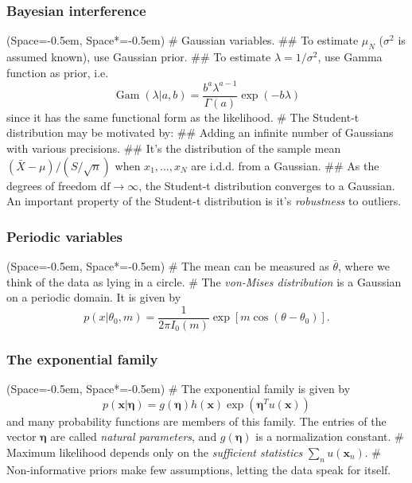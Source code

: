 \documentclass[12pt, a4paper]{article}
\newcommand{\listSpace}{-0.5em}%
\newcommand{\vect}[1]{\bm{#1}}
\begin{document}
\subsubsection*{Bayesian interference}
\begin{easylist}[itemize]
	\ListProperties(Space=\listSpace, Space*=\listSpace)
	# Gaussian variables.
	## To estimate $\mu_N$ ($\sigma^2$ is assumed known), use Gaussian prior.
	## To estimate $\lambda = 1/\sigma^2$, use Gamma function as prior, i.e.
	\begin{equation*}
	\operatorname{Gam}(\lambda | a, b) = \frac{b^a \lambda^{a-1}}{\Gamma(a)} \exp (-b \lambda)
	\end{equation*}
	since it has the same functional form as the likelihood.
	# The Student-t distribution may be motivated by:
	## Adding an infinite number of Gaussians with various precisions. 
	## It's the distribution of the sample mean  $(\bar{X} - \mu ) / (S / \sqrt{n})$ when $x_1, \dots, x_N$ are i.d.d. from a Gaussian.
	## As the degrees of freedom $\text{df} \to \infty$, the Student-t distribution converges to a Gaussian.
	An important property of the Student-t distribution is it's \emph{robustness} to outliers.
\end{easylist}

\subsubsection*{Periodic variables}
\begin{easylist}[itemize]
	\ListProperties(Space=\listSpace, Space*=\listSpace)
	# The mean can be measured as $\bar{\theta}$, where we think of the data as lying in a circle.
	# The \emph{von-Mises distribution} is a Gaussian on a periodic domain.
	It is given by
	\begin{equation*}
	p(x | \theta_0, m) = \frac{1}{2 \pi I_0(m)} \exp \left[m \cos (\theta - \theta_0)\right].
	\end{equation*}
\end{easylist}

\subsubsection*{The exponential family}
\begin{easylist}[itemize]
	\ListProperties(Space=\listSpace, Space*=\listSpace)
	# The exponential family is given by
	\begin{equation*}
	p(\vect{x} | \vect{\eta}) =
	g(\vect{\eta})  h (\vect{x}) 
	\exp \left( \vect{\eta}^T u(\vect{x}) \right)
	\end{equation*}
	and many probability functions are members of this family.
	The entries of the vector $\vect{\eta}$ are called \emph{natural parameters}, and $g(\vect{\eta})$ is a normalization constant.
	# Maximum likelihood depends only on the \emph{sufficient statistics} $\sum_n u(\vect{x}_n)$.
	# Non-informative priors make few assumptions,
	letting the data speak for itself.
\end{easylist}
\end{document}
